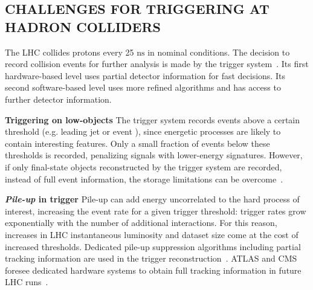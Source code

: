 \begin{textbox}[!h]
\section{CHALLENGES FOR TRIGGERING AT HADRON COLLIDERS}

The LHC collides protons every 25 $\mathrm{ns}$ in nominal conditions. 
The decision to record collision events for further analysis is made by the trigger system~\cite{Smith:2016vcs,Aaboud:2016leb,Khachatryan:2016bia}. 
Its first hardware-based level uses partial detector information for fast decisions.
Its second software-based level uses more refined algorithms and has access to further detector information.

\textbf{Triggering on low-\pt objects}
The trigger system records events above a certain threshold (e.g. leading jet \pt or event \MET), since energetic processes are likely to contain interesting features. 
Only a small fraction of events below these thresholds is recorded, penalizing signals with lower-energy signatures. 
However, if only final-state objects reconstructed by the trigger system are recorded, instead of full event information, the storage limitations can be overcome~\cite{Aaij:2016rxn,CMS-PAS-EXO-16-056,Aaboud:2016leb}. 

\textbf{\textit{Pile-up} in trigger} 
Pile-up can add energy uncorrelated to the hard process of interest, increasing the event rate for a given trigger threshold: trigger \MET rates grow exponentially with the number of additional interactions. 
For this reason, increases in LHC instantaneous luminosity and dataset size come at the cost of increased thresholds.
Dedicated pile-up suppression algorithms including partial tracking information are used in the trigger reconstruction~\cite{CMS:2014ata,ATLAS-CONF-2014-019}. ATLAS and CMS foresee dedicated hardware systems to obtain full tracking information in future LHC runs~\cite{Shochet:2013gaw,1748-0221-6-12-C12065}. 
 
\end{textbox}
